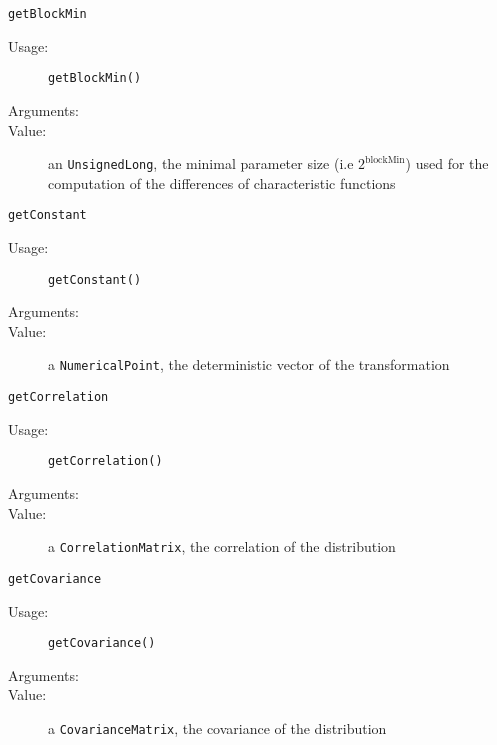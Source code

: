 \begin{description}
\begin{description}
  \item \texttt{getBlockMin}
    \begin{description}
    \item[Usage:]  \texttt{getBlockMin()}
    \item[Arguments:]  \strut
    \item[Value:] an \texttt{UnsignedLong}, the minimal parameter size (i.e $2^{\text{blockMin}}$) used for the computation of the differences of characteristic functions
    \end{description}

  \item \texttt{getConstant}
    \begin{description}
    \item[Usage:]  \texttt{getConstant()}
    \item[Arguments:]  \strut
    \item[Value:] a \texttt{NumericalPoint}, the deterministic vector of the transformation
    \end{description}

  \item \texttt{getCorrelation}
    \begin{description}
    \item[Usage:]  \texttt{getCorrelation()}
    \item[Arguments:]  \strut
    \item[Value:] a \texttt{CorrelationMatrix}, the correlation of the distribution
    \end{description}

  \item \texttt{getCovariance}
    \begin{description}
    \item[Usage:]  \texttt{getCovariance()}
    \item[Arguments:]  \strut
    \item[Value:] a \texttt{CovarianceMatrix}, the covariance of the distribution
    \end{description}


\end{description}
\end{description}
